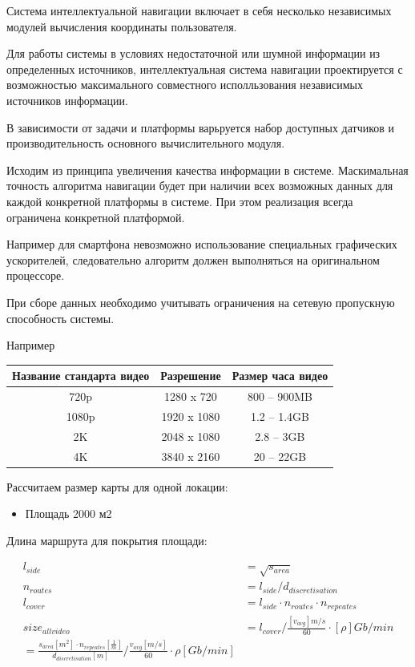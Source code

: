 Система интеллектуальной навигации включает в себя несколько независимых
модулей вычисления координаты пользователя.

Для работы системы в условиях недостаточной или шумной информации из
определенных источников, интеллектуальная система навигации
проектируется с возможностью максимального совместного исполльзования
независимых источников информации.

В зависимости от задачи и платформы варьруется набор доступных датчиков
и производительность основного вычислительного модуля.

Исходим из принципа увеличения качества информации в системе.
Маскимальная точность алгоритма навигации будет при наличии всех
возможных данных для каждой конкретной платформы в системе. При этом
реализация всегда ограничена конкретной платформой.

Например для смартфона невозможно использование специальных графических
ускорителей, следовательно алгоритм должен выполняться на оригинальном
процессоре.

При сборе данных необходимо учитывать ограничения на сетевую пропускную
способность системы.

Например

\begin{longtable}[]{@{}ccc@{}}
\toprule
Название стандарта видео & Разрешение & Размер часа видео\tabularnewline
\midrule
\endhead
720p & 1280 x 720 & 800 -- 900MB\tabularnewline
1080p & 1920 x 1080 & 1.2 -- 1.4GB\tabularnewline
2K & 2048 x 1080 & 2.8 -- 3GB\tabularnewline
4K & 3840 x 2160 & 20 -- 22GB\tabularnewline
\bottomrule
\end{longtable}

Рассчитаем размер карты для одной локации:

\begin{itemize}
\tightlist
\item
  Площадь 2000 м2
\end{itemize}

Длина маршрута для покрытия площади:

\begin{align}
l_{side} &= \sqrt{s_{area}} \\ 
n_{routes} &= l_{side} / d_{discretisation} \\
l_{cover} &= l_{side} \cdot n_{routes} \cdot n_{repeates}  \\ 
size_{all video} &= l_{cover} / \frac{[v_{avg}]{m/s}}{60} \cdot [\rho] {Gb / min} \\
= \frac{s_{area}[m^2] \cdot n_{repeates}[{\frac{1}{m}}]}{d_{discretisation}[{m}]} / \frac{v_{avg}[{m/s}]}{60} \cdot \rho [{Gb / min}] \\
\end{align}

